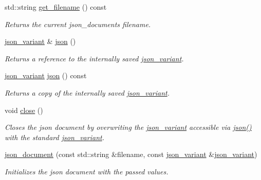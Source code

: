 \begin{DoxyCompactItemize}
std\+::string \hyperlink{classJSONLIB__NAMESPACE_1_1json__document_a6f362476926f33fb8c3437d15052e959}{get\+\_\+filename} () const
\begin{DoxyCompactList}\small\item\em Returns the current json\+\_\+documents {\itshape filename}. \end{DoxyCompactList}\item 
\hyperlink{classJSONLIB__NAMESPACE_1_1json__variant}{json\+\_\+variant} \& \hyperlink{classJSONLIB__NAMESPACE_1_1json__document_ad87b8e7d68ba854dbd730758273a3b93}{json} ()
\begin{DoxyCompactList}\small\item\em Returns a reference to the internally saved \hyperlink{classJSONLIB__NAMESPACE_1_1json__variant}{json\+\_\+variant}. \end{DoxyCompactList}\item 
\hyperlink{classJSONLIB__NAMESPACE_1_1json__variant}{json\+\_\+variant} \hyperlink{classJSONLIB__NAMESPACE_1_1json__document_afc25f82f6d2729be0ae1bcc82b8968e3}{json} () const
\begin{DoxyCompactList}\small\item\em Returns a copy of the internally saved \hyperlink{classJSONLIB__NAMESPACE_1_1json__variant}{json\+\_\+variant}. \end{DoxyCompactList}\item 
\mbox{\label{classJSONLIB__NAMESPACE_1_1json__document_a0a79ac1420c95c0f1de9670c7f81537d}} 
void \hyperlink{classJSONLIB__NAMESPACE_1_1json__document_a0a79ac1420c95c0f1de9670c7f81537d}{close} ()
\begin{DoxyCompactList}\small\item\em Closes the json document by overwriting the \hyperlink{classJSONLIB__NAMESPACE_1_1json__variant}{json\+\_\+variant} accessible via \hyperlink{classJSONLIB__NAMESPACE_1_1json__document_ad87b8e7d68ba854dbd730758273a3b93}{json()} with the standard \hyperlink{classJSONLIB__NAMESPACE_1_1json__variant}{json\+\_\+variant}. \end{DoxyCompactList}\item 
\hyperlink{classJSONLIB__NAMESPACE_1_1json__document_abf4e22f3453ec9856f58a202dae0c836}{json\+\_\+document} (const std\+::string \&filename, const \hyperlink{classJSONLIB__NAMESPACE_1_1json__variant}{json\+\_\+variant} \&\hyperlink{classJSONLIB__NAMESPACE_1_1json__variant}{json\+\_\+variant})
\begin{DoxyCompactList}\small\item\em Initializes the json document with the passed values. \end{DoxyCompactList}\item 

\end{DoxyCompactItemize}
